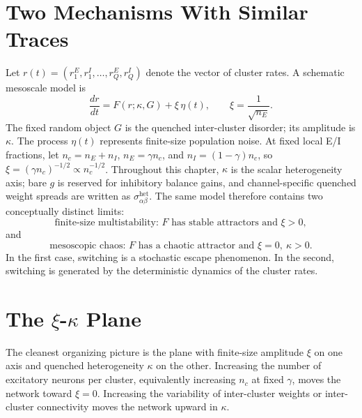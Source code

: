 \section{Two Mechanisms With Similar Traces}
\label{sec:ch09-two-mechanisms}

Let \(r(t)=(r_1^E,r_1^I,\ldots,r_Q^E,r_Q^I)\) denote the vector of cluster
rates. A schematic mesoscale model is
\begin{equation}
    \frac{d r}{dt}
    =
    F(r;\kappa,G)
    +
    \xi\,\eta(t),
    \qquad
    \xi=\frac{1}{\sqrt{n_E}}.
    \label{eq:ch09-schematic-mesoscale}
\end{equation}
The fixed random object \(G\) is the quenched inter-cluster disorder; its
amplitude is \(\kappa\). The process \(\eta(t)\) represents finite-size
population noise. At fixed local E/I fractions, let
\(n_c=n_E+n_I\), \(n_E=\gamma n_c\), and \(n_I=(1-\gamma)n_c\), so
\(\xi=(\gamma n_c)^{-1/2}\propto n_c^{-1/2}\). Throughout this chapter,
\(\kappa\) is the scalar heterogeneity axis; bare \(g\) is reserved for
inhibitory balance gains, and channel-specific quenched weight spreads are
written as \(\sigma_{\alpha\beta}^{\mathrm{het}}\). The same model therefore
contains two conceptually distinct limits:
\begin{equation}
    \text{finite-size multistability: }
    F \text{ has stable attractors and } \xi>0,
    \label{eq:ch09-multistable-limit}
\end{equation}
and
\begin{equation}
    \text{mesoscopic chaos: }
    F \text{ has a chaotic attractor and } \xi=0,\ \kappa>0 .
    \label{eq:ch09-chaotic-limit}
\end{equation}
In the first case, switching is a stochastic escape phenomenon. In the second,
switching is generated by the deterministic dynamics of the cluster rates.

\section[The xi-kappa Plane]{The \(\xi\)-\(\kappa\) Plane}
\label{sec:ch09-xi-kappa-plane}

The cleanest organizing picture is the plane with finite-size amplitude
\(\xi\) on one axis and quenched heterogeneity \(\kappa\) on the other.
Increasing the number of excitatory neurons per cluster, equivalently
increasing \(n_c\) at fixed \(\gamma\), moves the network toward \(\xi=0\).
Increasing the variability of inter-cluster weights or inter-cluster
connectivity moves the network upward in \(\kappa\).

